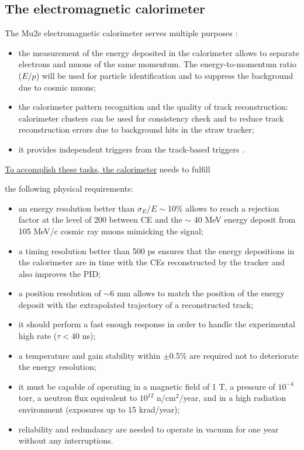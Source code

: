 \subsection{The electromagnetic calorimeter}\label{calorimeter}
The Mu2e electromagnetic calorimeter serves multiple purposes \cite{em4}:
\begin{itemize}
    \item the measurement of the energy deposited in the calorimeter 
    allows to separate electrons and muons of the same momentum. 
    The energy-to-momentum ratio ($E/p$) will be used for particle 
    identification and to suppress the background due to cosmic muons;
  \item the calorimeter  
     pattern recognition and 
    the quality of  track reconstruction: {\red calorimeter clusters can be used 
      for consistency check}
    {\red and to reduce track reconstruction 
      errors due to background hits in the straw tracker;}
    \item it provides independent triggers from the track-based triggers \cite{em6}. 
\end{itemize} 
\underline{\red To accomplish these tasks, the calorimeter} needs to fulfill

the following physical requirements:
\begin{itemize}
    \item an energy resolution better than $\sigma_E/E \sim$10\% allows
     to reach a rejection factor at the level of 200 between CE
    and the $\sim$ 40 MeV energy deposit from 105 MeV/c cosmic ray muons mimicking the signal;
    \item a timing resolution better than 500 ps ensures that
    the energy depositions in the calorimeter are in time with
    the CEs reconstructed by the tracker and
    also improves the PID;
    \item a position resolution of $\sim$6 mm allows 
    to match the position of the energy deposit with the 
    extrapolated trajectory of a reconstructed track;
    \item it should perform a fast enough 
      response in order to handle the experimental high rate ($\tau < 40$ ns);
    \item a temperature and gain stability within $\pm$0.5\% 
    are required not to deteriorate the energy resolution;
    \item it must be capable of operating in 
    a magnetic field of 1 T, a pressure of \(10^{-4}\) torr, a 
    neutron flux equivalent to \(10^{12}\) n/cm\(^2\)/year, 
    and in a high radiation environment (exposures up to 15 krad/year);
    \item reliability and redundancy are needed to operate in vacuum for one
    year without any interruptions.
\end{itemize}


